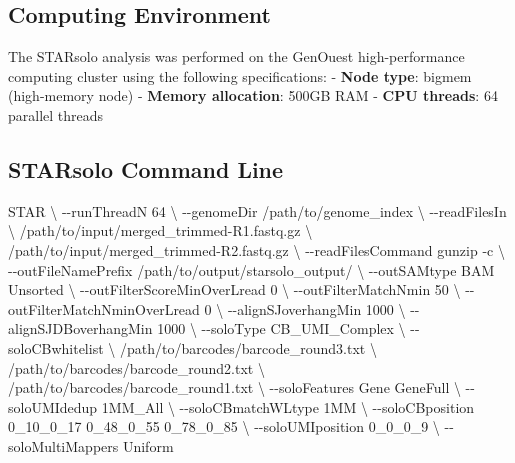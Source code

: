 \documentclass[
  11pt,
  a4paper,
]{report}
\newenvironment{Shaded}{\begin{snugshade}}{\end{snugshade}}
\newcommand{\AttributeTok}[1]{\textcolor[rgb]{0.40,0.45,0.13}{#1}}
\newcommand{\DataTypeTok}[1]{\textcolor[rgb]{0.68,0.00,0.00}{#1}}
\newcommand{\ExtensionTok}[1]{\textcolor[rgb]{0.00,0.23,0.31}{#1}}
\newcommand{\NormalTok}[1]{\textcolor[rgb]{0.00,0.23,0.31}{#1}}
\begin{document}
\subsection{Computing Environment}\label{computing-environment}

The STARsolo analysis was performed on the GenOuest high-performance
computing cluster using the following specifications: - \textbf{Node
type}: bigmem (high-memory node) - \textbf{Memory allocation}: 500GB RAM
- \textbf{CPU threads}: 64 parallel threads

\subsection{STARsolo Command Line}\label{starsolo-command-line}

\begin{Shaded}
\begin{Highlighting}[]
\ExtensionTok{STAR} \DataTypeTok{\textbackslash{}}
\NormalTok{{-}{-}runThreadN 64 }\DataTypeTok{\textbackslash{}}
\NormalTok{{-}{-}genomeDir /path/to/genome\_index }\DataTypeTok{\textbackslash{}}
\NormalTok{{-}{-}readFilesIn }\DataTypeTok{\textbackslash{}}
\NormalTok{/path/to/input/merged\_trimmed{-}R1.fastq.gz }\DataTypeTok{\textbackslash{}}
\NormalTok{/path/to/input/merged\_trimmed{-}R2.fastq.gz }\DataTypeTok{\textbackslash{}}
\NormalTok{{-}{-}readFilesCommand gunzip }\AttributeTok{{-}c} \DataTypeTok{\textbackslash{}}
\NormalTok{{-}{-}outFileNamePrefix /path/to/output/starsolo\_output/ }\DataTypeTok{\textbackslash{}}
\NormalTok{{-}{-}outSAMtype BAM Unsorted }\DataTypeTok{\textbackslash{}}
\NormalTok{{-}{-}outFilterScoreMinOverLread 0 }\DataTypeTok{\textbackslash{}}
\NormalTok{{-}{-}outFilterMatchNmin 50 }\DataTypeTok{\textbackslash{}}
\NormalTok{{-}{-}outFilterMatchNminOverLread 0 }\DataTypeTok{\textbackslash{}}
\NormalTok{{-}{-}alignSJoverhangMin 1000 }\DataTypeTok{\textbackslash{}}
\NormalTok{{-}{-}alignSJDBoverhangMin 1000 }\DataTypeTok{\textbackslash{}}
\NormalTok{{-}{-}soloType CB\_UMI\_Complex }\DataTypeTok{\textbackslash{}}
\NormalTok{{-}{-}soloCBwhitelist }\DataTypeTok{\textbackslash{}}
\NormalTok{/path/to/barcodes/barcode\_round3.txt }\DataTypeTok{\textbackslash{}}
\NormalTok{/path/to/barcodes/barcode\_round2.txt }\DataTypeTok{\textbackslash{}}
\NormalTok{/path/to/barcodes/barcode\_round1.txt }\DataTypeTok{\textbackslash{}}
\NormalTok{{-}{-}soloFeatures Gene GeneFull }\DataTypeTok{\textbackslash{}}
\NormalTok{{-}{-}soloUMIdedup 1MM\_All }\DataTypeTok{\textbackslash{}}
\NormalTok{{-}{-}soloCBmatchWLtype 1MM }\DataTypeTok{\textbackslash{}}
\NormalTok{{-}{-}soloCBposition 0\_10\_0\_17 0\_48\_0\_55 0\_78\_0\_85 }\DataTypeTok{\textbackslash{}}
\NormalTok{{-}{-}soloUMIposition 0\_0\_0\_9 }\DataTypeTok{\textbackslash{}}
\NormalTok{{-}{-}soloMultiMappers Uniform}
\end{Highlighting}
\end{Shaded}
\end{document}
